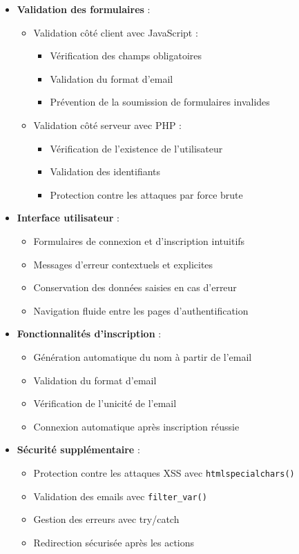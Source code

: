 \documentclass[12pt,a4paper]{article}
\begin{document}
\begin{itemize}
    \item \textbf{Validation des formulaires} :
    \begin{itemize}
        \item Validation côté client avec JavaScript :
        \begin{itemize}
            \item Vérification des champs obligatoires
            \item Validation du format d'email
            \item Prévention de la soumission de formulaires invalides
        \end{itemize}
        \item Validation côté serveur avec PHP :
        \begin{itemize}
            \item Vérification de l'existence de l'utilisateur
            \item Validation des identifiants
            \item Protection contre les attaques par force brute
        \end{itemize}
    \end{itemize}

    \item \textbf{Interface utilisateur} :
    \begin{itemize}
        \item Formulaires de connexion et d'inscription intuitifs
        \item Messages d'erreur contextuels et explicites
        \item Conservation des données saisies en cas d'erreur
        \item Navigation fluide entre les pages d'authentification
    \end{itemize}

    \item \textbf{Fonctionnalités d'inscription} :
    \begin{itemize}
        \item Génération automatique du nom à partir de l'email
        \item Validation du format d'email
        \item Vérification de l'unicité de l'email
        \item Connexion automatique après inscription réussie
    \end{itemize}

    \item \textbf{Sécurité supplémentaire} :
    \begin{itemize}
        \item Protection contre les attaques XSS avec \texttt{htmlspecialchars()}
        \item Validation des emails avec \texttt{filter\_var()}
        \item Gestion des erreurs avec try/catch
        \item Redirection sécurisée après les actions
    \end{itemize}
\end{itemize}
\end{document}
